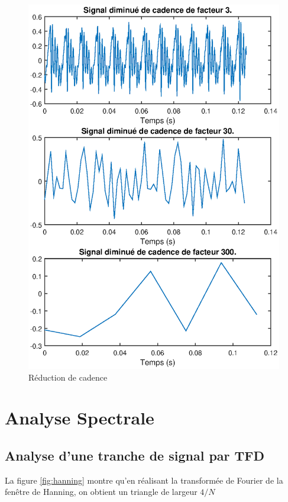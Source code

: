 \documentclass[french]{article}
\begin{document}
\begin{figure}[h!]
\begin{minipage}{0.5\textwidth}
	\includegraphics[width=\textwidth]{images/cadence_diminue.eps}
	\caption{Réduction de cadence}
	\label{fig:réduction}
\end{minipage}
\end{figure}

\FloatBarrier
\section{Analyse Spectrale}
\subsection{Analyse d'une tranche de signal par TFD}

La figure \ref{fig:hanning} montre qu'en réalisant la transformée de Fourier de la fenêtre de Hanning, on obtient un triangle de largeur $4/N$
  
\end{document}
